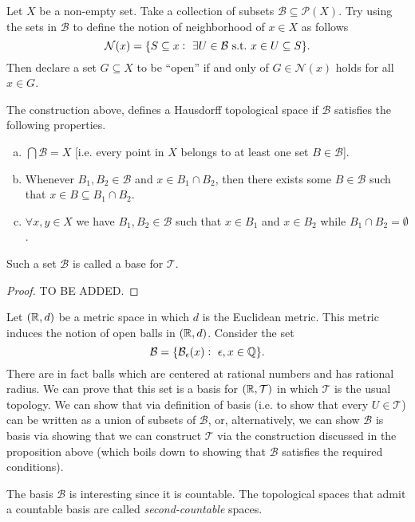 \begin{proposition}
	Let $X$ be a  non-empty set. Take a collection of subsets $\mathcal{B} \subseteq \mathcal{P}(X)$. Try using the sets in $\mathcal{B}$ to define the notion of neighborhood of $x\in X$ as follows
	\[ \mathcal{N}(x) = \{ S \subseteq x:\ \exists U \in \mathcal{B} \ \text{s.t.}\  x \in U \subseteq S \}. \]
	Then declare a set $G \subseteq X$ to be ``open'' if and only of $G \in \mathcal{N}(x)$ holds for all $x\in G$.
	
	The construction above, defines a Hausdorff topological space if $\mathcal{B}$ satisfies the following properties. 
	\begin{enumerate}[(a)]
		\item $\bigcap \mathcal{B} = X $ [i.e. every point in $X$ belongs to at least one set $B \in \mathcal{B}$].
		\item Whenever $B_1, B_2 \in \mathcal{B}$ and $x \in B_1 \cap B_2$, then there exists some $B \in \mathcal{B}$ such that $x \in B \subseteq B_1 \cap B_2$.
		\item $\forall x,y \in X$ we have $B_1, B_2 \in \mathcal{B}$ such that $x \in B_1$ and $x \in B_2$ while $B_1 \cap B_2 = \emptyset$.
	\end{enumerate} 

	Such a set $\mathcal{B}$ is called a base for $\mathcal{T}$.
\end{proposition}


\begin{proof}
	TO BE ADDED.
\end{proof}

\begin{example}
	Let $(\mathbb{R}, d)$ be a metric space in which $d$ is the Euclidean metric. This metric induces the notion of open balls in $(\mathbb{R}, d)$. Consider the set
	\[ \mathcal{B} = \{ \mathcal{B}_{\epsilon}(x):\ \epsilon, x \in \mathbb{Q} \}. \]
	There are in fact balls which are centered at rational numbers and has rational radius. We can prove that this set is a basis for $(\mathbb{R}, \mathcal{T})$ in which $\mathcal{T}$ is the usual topology. We can show that via definition of basis (i.e. to show that every $U \in \mathcal{T}$) can be written as a union of subsets of $\mathcal{B}$, or, alternatively, we can show $\mathcal{B}$ is basis via showing that we can construct $\mathcal{T}$ via the construction discussed in the proposition above (which boils down to showing that $\mathcal{B}$ satisfies the required conditions).
	
	The basis $\mathcal{B}$ is interesting since it is countable. The topological spaces that admit a countable basis are called \emph{second-countable} spaces.  
\end{example}


